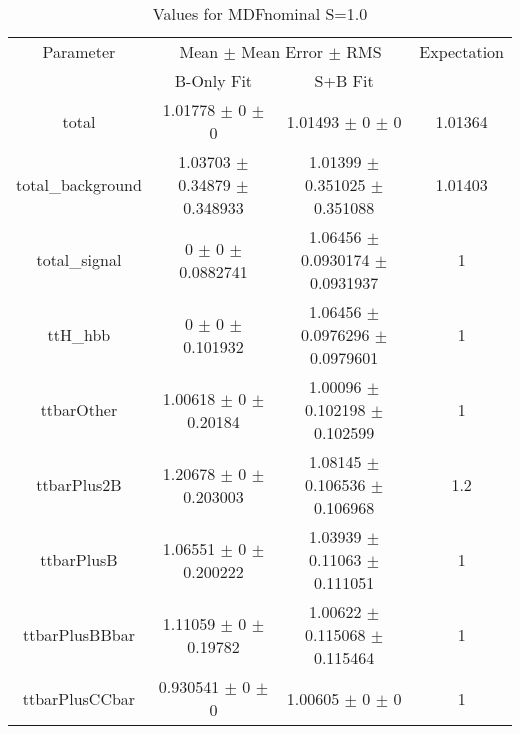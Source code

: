 \begin{table}
\centering
\caption{Values for MDFnominal S=1.0}
\begin{tabular}{cccc}
\toprule
Parameter & \multicolumn{2}{c}{Mean $\pm$ Mean Error $\pm$ RMS} & Expectation\\
 & B-Only Fit & S+B Fit & \\
\midrule
total & \num{1.01778} $\pm$ \num{0} $\pm$ \num{0} & \num{1.01493} $\pm$ \num{0} $\pm$ \num{0} & \num{1.01364}\\
total\_background & \num{1.03703} $\pm$ \num{0.34879} $\pm$ \num{0.348933} & \num{1.01399} $\pm$ \num{0.351025} $\pm$ \num{0.351088} & \num{1.01403}\\
total\_signal & \num{0} $\pm$ \num{0} $\pm$ \num{0.0882741} & \num{1.06456} $\pm$ \num{0.0930174} $\pm$ \num{0.0931937} & \num{1}\\
ttH\_hbb & \num{0} $\pm$ \num{0} $\pm$ \num{0.101932} & \num{1.06456} $\pm$ \num{0.0976296} $\pm$ \num{0.0979601} & \num{1}\\
ttbarOther & \num{1.00618} $\pm$ \num{0} $\pm$ \num{0.20184} & \num{1.00096} $\pm$ \num{0.102198} $\pm$ \num{0.102599} & \num{1}\\
ttbarPlus2B & \num{1.20678} $\pm$ \num{0} $\pm$ \num{0.203003} & \num{1.08145} $\pm$ \num{0.106536} $\pm$ \num{0.106968} & \num{1.2}\\
ttbarPlusB & \num{1.06551} $\pm$ \num{0} $\pm$ \num{0.200222} & \num{1.03939} $\pm$ \num{0.11063} $\pm$ \num{0.111051} & \num{1}\\
ttbarPlusBBbar & \num{1.11059} $\pm$ \num{0} $\pm$ \num{0.19782} & \num{1.00622} $\pm$ \num{0.115068} $\pm$ \num{0.115464} & \num{1}\\
ttbarPlusCCbar & \num{0.930541} $\pm$ \num{0} $\pm$ \num{0} & \num{1.00605} $\pm$ \num{0} $\pm$ \num{0} & \num{1}\\
\bottomrule
\end{tabular}
\end{table}